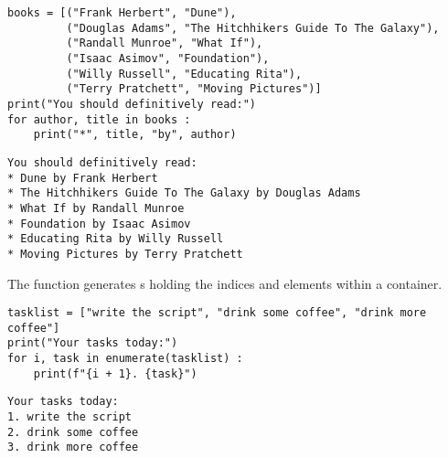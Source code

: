 
\begin{frame}[fragile]
%
\vspace{-5pt}
\begin{codebox}
\begin{verbatim}
books = [("Frank Herbert", "Dune"),
         ("Douglas Adams", "The Hitchhikers Guide To The Galaxy"),
         ("Randall Munroe", "What If"),
         ("Isaac Asimov", "Foundation"),
         ("Willy Russell", "Educating Rita"),
         ("Terry Pratchett", "Moving Pictures")]
print("You should definitively read:")
for author, title in books :
    print("*", title, "by", author)
\end{verbatim}
\end{codebox}
%
\vspace{-10pt}
\begin{cmdbox}
\begin{verbatim}
You should definitively read:
* Dune by Frank Herbert
* The Hitchhikers Guide To The Galaxy by Douglas Adams
* What If by Randall Munroe
* Foundation by Isaac Asimov
* Educating Rita by Willy Russell
* Moving Pictures by Terry Pratchett
\end{verbatim}
\end{cmdbox}
%
\end{frame}


\begin{frame}[fragile]
%
\begin{hintbox}
The function  generates s holding the indices and elements within a container.
\end{hintbox}
%
\begin{codebox}
\begin{verbatim}
tasklist = ["write the script", "drink some coffee", "drink more coffee"]
print("Your tasks today:")
for i, task in enumerate(tasklist) :
    print(f"{i + 1}. {task}")
\end{verbatim}
\end{codebox}
%
\begin{cmdbox}
\begin{verbatim}
Your tasks today:
1. write the script
2. drink some coffee
3. drink more coffee
\end{verbatim}
\end{cmdbox}
%
\end{frame}

